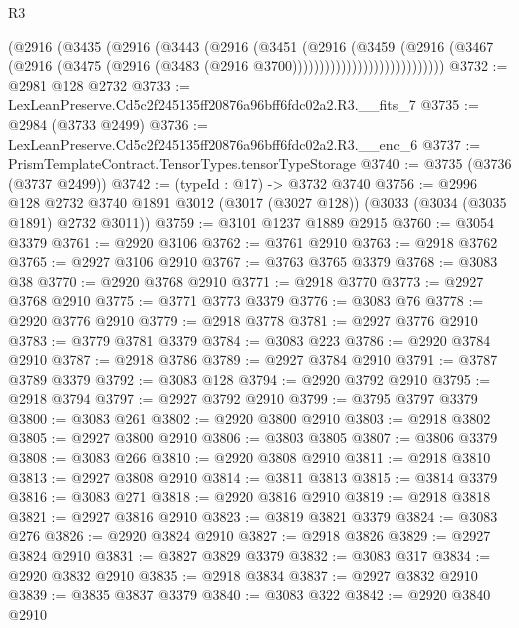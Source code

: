 \begin{lexlean}{R3}
\begin{coremodule}
                              (@2916
                                (@3435
                                  (@2916
                                    (@3443
                                      (@2916
                                        (@3451
                                          (@2916
                                            (@3459
                                              (@2916
                                                (@3467
                                                  (@2916
                                                    (@3475
                                                      (@2916
                                                        (@3483
                                                          (@2916 @3700))))))))))))))))))))))))))))
@3732 := @2981 @128 @2732
@3733 := LexLeanPreserve.Cd5c2f245135ff20876a96bff6fdc02a2.R3.__fits_7
@3735 := @2984 (@3733 @2499)
@3736 := LexLeanPreserve.Cd5c2f245135ff20876a96bff6fdc02a2.R3.__enc_6
@3737 := PrismTemplateContract.TensorTypes.tensorTypeStorage
@3740 := @3735 (@3736 (@3737 @2499))
@3742 := (typeId : @17) -> @3732 @3740
@3756 := @2996
    @128
    @2732
    @3740
    @1891
    @3012
    (@3017 (@3027 @128))
    (@3033 (@3034 (@3035 @1891) @2732 @3011))
@3759 := @3101 @1237 @1889 @2915
@3760 := @3054 @3379
@3761 := @2920 @3106
@3762 := @3761 @2910
@3763 := @2918 @3762
@3765 := @2927 @3106 @2910
@3767 := @3763 @3765 @3379
@3768 := @3083 @38
@3770 := @2920 @3768 @2910
@3771 := @2918 @3770
@3773 := @2927 @3768 @2910
@3775 := @3771 @3773 @3379
@3776 := @3083 @76
@3778 := @2920 @3776 @2910
@3779 := @2918 @3778
@3781 := @2927 @3776 @2910
@3783 := @3779 @3781 @3379
@3784 := @3083 @223
@3786 := @2920 @3784 @2910
@3787 := @2918 @3786
@3789 := @2927 @3784 @2910
@3791 := @3787 @3789 @3379
@3792 := @3083 @128
@3794 := @2920 @3792 @2910
@3795 := @2918 @3794
@3797 := @2927 @3792 @2910
@3799 := @3795 @3797 @3379
@3800 := @3083 @261
@3802 := @2920 @3800 @2910
@3803 := @2918 @3802
@3805 := @2927 @3800 @2910
@3806 := @3803 @3805
@3807 := @3806 @3379
@3808 := @3083 @266
@3810 := @2920 @3808 @2910
@3811 := @2918 @3810
@3813 := @2927 @3808 @2910
@3814 := @3811 @3813
@3815 := @3814 @3379
@3816 := @3083 @271
@3818 := @2920 @3816 @2910
@3819 := @2918 @3818
@3821 := @2927 @3816 @2910
@3823 := @3819 @3821 @3379
@3824 := @3083 @276
@3826 := @2920 @3824 @2910
@3827 := @2918 @3826
@3829 := @2927 @3824 @2910
@3831 := @3827 @3829 @3379
@3832 := @3083 @317
@3834 := @2920 @3832 @2910
@3835 := @2918 @3834
@3837 := @2927 @3832 @2910
@3839 := @3835 @3837 @3379
@3840 := @3083 @322
@3842 := @2920 @3840 @2910

\end{coremodule}
\end{lexlean}
